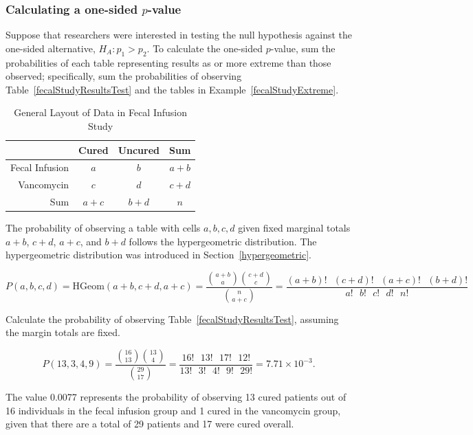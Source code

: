 \subsubsection{Calculating a one-sided $p$-value}

Suppose that researchers were interested in testing the null hypothesis against the one-sided alternative, $H_A: p_1 > p_2$. To calculate the one-sided $p$-value, sum the probabilities of each table representing results as or more extreme than those observed; specifically, sum the probabilities of observing Table~\ref{fecalStudyResultsTest} and the tables in Example~\ref{fecalStudyExtreme}.

\begin{table}[h]
	\centering
	\begin{tabular}{rccc}
		\hline
		& Cured & Uncured & Sum \\ 
		\hline
		Fecal Infusion & $a$ & $b$ & $a+b$ \\ 
		Vancomycin & $c$ & $d$ & $c+d$ \\ 
		Sum & $a+c$ & $b+d$ & $n$ \\ 
		\hline
	\end{tabular}
	\caption{General Layout of Data in Fecal Infusion Study} 
	\label{fecalStudyGeneral}
\end{table}


The probability of observing a table with cells $a, b, c, d$ given fixed marginal totals $a+b$, $c+d$, $a + c$, and $b +d$ follows the hypergeometric distribution.  The hypergeometric distribution was introduced in Section~\ref{hypergeometric}.

\[P(a,b,c,d) = \text{HGeom}(a+b, c+d, a+c) = \dfrac{ {a+b \choose a} {c+d \choose c}}{{n \choose a+c}} = \dfrac{(a+b)! \text{ } (c+d)! \text{ } (a+c)! \text{ } (b+d)!}{a! \text{ } b! \text{ } c! \text{ } d! \text{ } n!}\]

\begin{example}{Calculate the probability of observing Table~\ref{fecalStudyResultsTest}, assuming the margin totals are fixed.}

\[P(13, 3, 4, 9) = \dfrac{ {16 \choose 13} {13 \choose 4}}{{29 \choose 17}} = \dfrac{16! \text{ } 13! \text{ } 17! \text{ } 12!}{13! \text{ } 3! \text{ } 4! \text{ } 9! \text{ } 29!} = 7.71 \times 10^{-3}.\]

The value 0.0077 represents the probability of observing 13 cured patients out of 16 individuals in the fecal infusion group and 1 cured in the vancomycin group, given that there are a total of 29 patients and 17 were cured overall.
\end{example}

